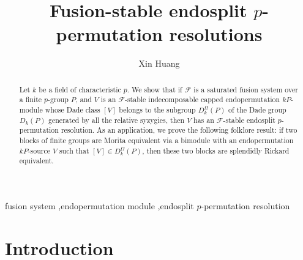 \documentclass[preprint,12pt,3p]{elsarticle}
\def\F{\mathcal{F}}
\begin{document}
\begin{frontmatter}
	
	\title{Fusion-stable endosplit $p$-permutation resolutions}
	
	
	
	\author{Xin Huang}
	
	
	\begin{abstract}
Let $k$ be a field of characteristic $p$. We show that if $\mathcal{F}$ is a saturated fusion system over a finite $p$-group $P$, and $V$ is an $\mathcal{F}$-stable indecomposable capped endopermutation $kP$-module whose Dade class $[V]$ belongs to the subgroup $D_k^\Omega(P)$ of the Dade group $D_k(P)$ generated by all the relative syzygies, then $V$ has an $\F$-stable endosplit $p$-permutation resolution. As an application, we prove the following folklore result: if two blocks of finite groups are Morita equivalent via a bimodule with an endopermutation $kP$-source $V$ such that $[V]\in D_k^\Omega(P)$, then these two blocks are splendidly Rickard equivalent.
	\end{abstract}
	
	\begin{keyword}
	fusion system \sep endopermutation module \sep endosplit $p$-permutation resolution
	\end{keyword}
	
\end{frontmatter}


\section{Introduction}\label{s1}
\end{document}
